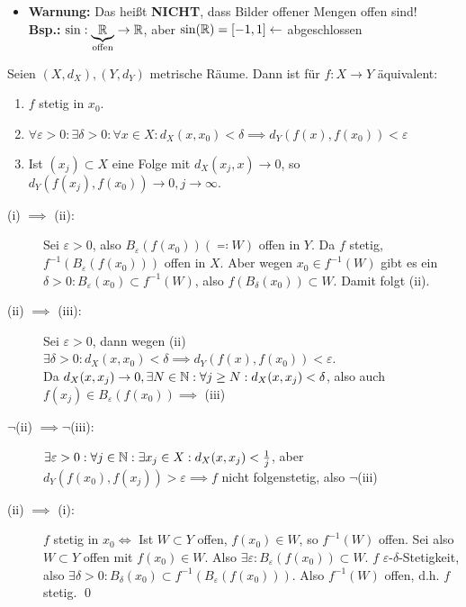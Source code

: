\begin{itemize}
	\item \textbf{Warnung:} Das heißt \textbf{NICHT}, dass Bilder offener Mengen offen sind!\\
		\textbf{Bsp.:} $ \sin : \underbrace{\mathbb{R} }_{\text{offen} }\to \mathbb{R}  $, aber $ \sin (\mathbb{R} ) = [-1, 1] \leftarrow $ abgeschlossen
\end{itemize}

\begin{subtheorem}
	Seien $ (X, d_X), (Y, d_Y) $ metrische Räume. Dann ist für $ f: X \to Y $ äquivalent:
	\begin{enumerate}[label=(\roman*)]
		\item $ f $ stetig in $ x_0 $.
		\item $ \forall \varepsilon > 0: \exists \delta > 0 : \forall x \in  X : d_{X} (x, x_0) < \delta \implies d_Y(f(x), f(x_0)) < \varepsilon  $
		\item Ist $ (x_j) \subset X $ eine Folge mit $ d_X(x_j, x) \to 0 $, so $ d_Y(f(x_j), f(x_0)) \to 0, j \to \infty. $
	\end{enumerate}
\end{subtheorem}

\begin{subproof*}
	\begin{description}
		\item[(i) $ \implies  $ (ii):] Sei $ \varepsilon > 0 $, also $ B_{\varepsilon}(f(x_0)) ( \eqcolon W) $ offen in $ Y $. Da $ f $ stetig, $ f^{-1} (B_{\varepsilon}(f(x_0) )) $ offen in $ X $. Aber wegen $ x_0 \in f^{-1} (W) $ gibt es ein $ \delta > 0 : B_{\varepsilon}(x_0) \subset f^{-1} (W) $, also $ f(B_{\delta}(x_0) ) \subset W $. Damit folgt (ii).
		\item[(ii) $ \implies  $ (iii):] Sei $ \varepsilon > 0 $, dann wegen (ii) $ \exists \delta > 0 : d_X(x, x_0) < \delta \implies d_Y(f(x), f(x_0)) < \varepsilon  $.\\
			Da $ d_X(x, x_j) \to 0, \exists N \in \mathbb{N} : \forall j \geq N: d_X(x, x_j) < \delta $, also auch $ f(x_j) \in B_{\varepsilon}(f(x_0)) \implies  $ (iii)
		\item[$ \neg $(ii) $ \implies \neg $(iii):] $ \exists \varepsilon > 0: \forall j \in \mathbb{N} : \exists x_j \in X: d_X(x, x_j) < \frac{ 1 }{ j }  $, aber $ d_Y(f(x_0), f(x_j)) > \varepsilon \implies f $ nicht folgenstetig, also $ \neg $(iii)
		\item[(ii) $ \implies  $ (i):] $ f $ stetig in $ x_0 \iff $  Ist $ W \subset Y $ offen, $ f(x_0) \in W $, so $ f^{-1} (W) $ offen. Sei also $ W \subset Y $ offen mit $ f(x_0) \in W $. Also $ \exists \varepsilon : B_{\varepsilon}(f(x_0)) \subset W $. $ f $ $ \varepsilon $-$ \delta $-Stetigkeit, also $ \exists \delta > 0 : B_{\delta}(x_0) \subset f^{-1} \left( B_{\varepsilon}(f(x_0))  \right)  $. Also $ f^{-1} (W) $ offen, d.h. $ f $ stetig. \qed
	\end{description}
\end{subproof*}

